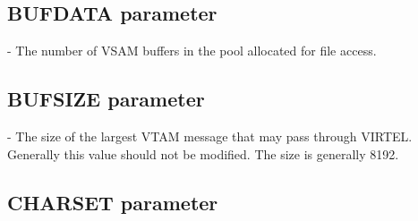 \documentclass[letterpaper,10pt,english]{sphinxmanual}
\begin{document}
\ignorespaces 

\subsection{BUFDATA parameter}
\label{\detokenize{Installation_Guide:bufdata-parameter}}\label{\detokenize{Installation_Guide:index-41}}
\begin{sphinxVerbatim}[commandchars=\\\{\}]
 
\end{sphinxVerbatim}

 - The number of VSAM buffers in the pool allocated for file access.

\ignorespaces 

\subsection{BUFSIZE parameter}
\label{\detokenize{Installation_Guide:bufsize-parameter}}\label{\detokenize{Installation_Guide:index-42}}
\begin{sphinxVerbatim}[commandchars=\\\{\}]
 
\end{sphinxVerbatim}

 - The size of the largest VTAM message that may pass through VIRTEL. Generally this value should not be modified. The size is generally 8192.

\ignorespaces 

\subsection{CHARSET parameter}
\label{\detokenize{Installation_Guide:charset-parameter}}\label{\detokenize{Installation_Guide:index-43}}
\begin{sphinxVerbatim}[commandchars=\\\{\}]
 
\end{sphinxVerbatim}
\end{document}
